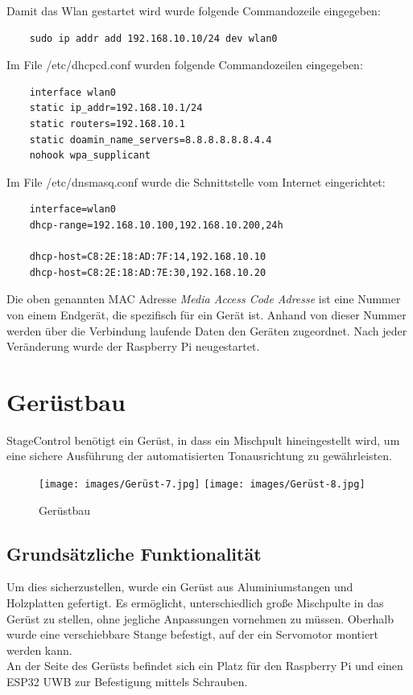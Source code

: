 Damit das Wlan gestartet wird wurde folgende Commandozeile eingegeben: 
\begin{lstlisting}
	sudo ip addr add 192.168.10.10/24 dev wlan0 
\end{lstlisting}

Im File /etc/dhcpcd.conf wurden folgende Commandozeilen eingegeben: 
\begin{lstlisting}
	interface wlan0
	static ip_addr=192.168.10.1/24
	static routers=192.168.10.1
	static doamin_name_servers=8.8.8.8.8.8.4.4
	nohook wpa_supplicant
\end{lstlisting}

Im File /etc/dnsmasq.conf wurde die Schnittstelle vom Internet eingerichtet:
\begin{lstlisting}
	interface=wlan0
	dhcp-range=192.168.10.100,192.168.10.200,24h
	
	dhcp-host=C8:2E:18:AD:7F:14,192.168.10.10
	dhcp-host=C8:2E:18:AD:7E:30,192.168.10.20
\end{lstlisting} 

Die oben genannten MAC Adresse \textit{Media Access Code Adresse} ist eine Nummer von einem Endgerät, die spezifisch für ein Gerät ist. Anhand von dieser Nummer werden über die Verbindung laufende Daten den Geräten zugeordnet. Nach jeder Veränderung wurde der Raspberry Pi neugestartet. 


\section{Gerüstbau}
StageControl benötigt ein Gerüst, in dass ein Mischpult hineingestellt wird, um eine sichere Ausführung der automatisierten Tonausrichtung zu gewährleisten. 


\begin{figure}[H]
	\centering
	\texttt{[image: images/Gerüst-7.jpg]}
	\texttt{[image: images/Gerüst-8.jpg]}
	\caption[Gerüstbau]{Gerüstbau}
	\label{fig:Gerüstbau}
\end{figure}


\subsection{Grundsätzliche Funktionalität}
Um dies sicherzustellen, wurde ein Gerüst aus Aluminiumstangen und Holzplatten gefertigt. Es ermöglicht, unterschiedlich große Mischpulte in das Gerüst zu stellen, ohne jegliche Anpassungen vornehmen zu müssen. Oberhalb wurde eine verschiebbare Stange befestigt, auf der ein Servomotor montiert werden kann.\\
An der Seite des Gerüsts befindet sich ein Platz für den Raspberry Pi und einen ESP32 UWB zur Befestigung mittels Schrauben.

